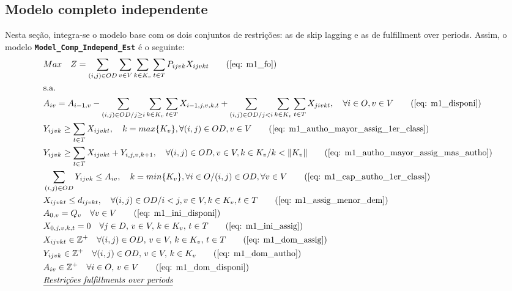 \subsection{Modelo completo independente}
Nesta seção, integra-se o modelo base com os dois conjuntos de restrições: as de skip lagging e as de fulfillment over periods.
Assim, o modelo \textbf{ \texttt{Model\_Comp\_Independ\_Est}} é o seguinte:
\allowdisplaybreaks
\begin{align}
	& Max \quad Z = \sum_{(i,j)\in OD} \sum_{v\in V} \sum_{k\in K_v} \sum_{t\in T} P_{ijvk} X_{ijvkt}     \tag{\ref{eq: m1_fo}}   \\
	& \text{s.a.}  \notag \\
	& A_{iv} = A_{i-1,v} - \sum_{(i,j) \in OD/j \geq i} \sum_{k\in K_v}\sum_{t\in T}X_{i-1,j,v,k,t} + \sum_{(i,j) \in OD/j<i} \sum_{k\in K_v}\sum_{t\in T}X_{jivkt}, \quad \forall i \in O, v \in V   \tag{\ref{eq: m1_disponi}} \\
	& Y_{ijvk} \geq  \sum_{t \in T} X_{ijvkt},  \quad k = max\{K_v\}, \forall(i,j) \in OD ,v \in V     \tag{\ref{eq: m1_autho_mayor_assig_1er_class}} \\
	& Y_{ijvk} \geq  \sum_{t \in T} X_{ijvkt} + Y_{i,j,v,k + 1} , \quad \forall(i,j) \in OD, v \in V, k \in K_v / k < \lVert K_v \rVert   \tag{\ref{eq: m1_autho_mayor_assig_mas_autho}} \\
	& \sum_{(i,j) \in OD} Y_{ijvk} \leq A_{iv}, \quad  k = min\{K_v\}, \forall i \in O / (i,j) \in OD,   \forall v \in V       \tag{\ref{eq: m1_cap_autho_1er_class}} \\
	& X_{ijvkt} \leq d_{ijvkt},  \quad \forall (i,j) \in OD / i < j  ,v \in V, k \in K_v, t\in T   \tag{\ref{eq: m1_assig_menor_dem}} \\
	& A_{0,v} = Q_v \quad \forall v \in V  \tag{\ref{eq: m1_ini_disponi}} \\ 
	& X_{0,j,v,k,t} = 0 \quad \forall j \in D,\, v \in V,\, k \in K_v,\, t \in T  \tag{\ref{eq: m1_ini_assig}} \\ 
	& X_{ijvkt} \in \mathbb{Z}^+ \quad \forall(i,j) \in OD,\, v \in V,\, k \in K_v,\, t \in T  \tag{\ref{eq: m1_dom_assig}} \\ 
	& Y_{ijvk} \in \mathbb{Z}^+ \quad \forall(i,j) \in OD,\, v \in V,\, k \in K_v  \tag{\ref{eq: m1_dom_autho}} \\ 
	& A_{iv} \in \mathbb{Z}^+ \quad \forall i \in O,\, v \in V  \tag{\ref{eq: m1_dom_disponi}} \\
	& \textit{\underline{Restrições fulfillments over periods}}         \notag   \\

\end{align}
